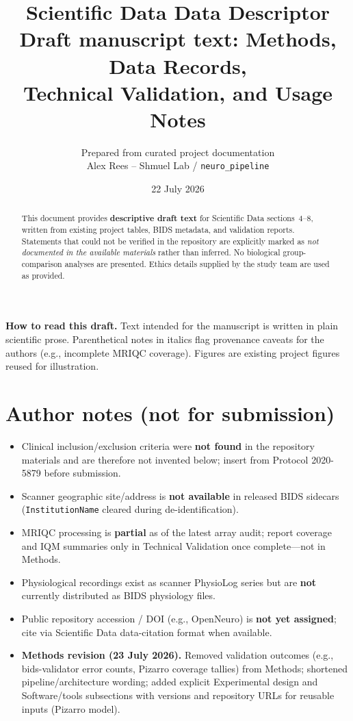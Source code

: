 \documentclass[11pt,letterpaper]{article}
\title{Scientific Data Data Descriptor\\[0.35em]
\large Draft manuscript text: Methods, Data Records,\\
Technical Validation, and Usage Notes}
\author{Prepared from curated project documentation\\
\small Alex Rees -- Shmuel Lab / \texttt{neuro\_pipeline}}
\date{22 July 2026}
\begin{document}
\maketitle

\begin{abstract}
\noindent
This document provides \textbf{descriptive draft text} for Scientific Data
sections~4--8, written from existing project tables, BIDS metadata, and
validation reports. Statements that could not be verified in the repository
are explicitly marked as \textit{not documented in the available materials}
rather than inferred. No biological group-comparison analyses are presented.
Ethics details supplied by the study team are used as provided.
\end{abstract}

\tableofcontents
\newpage

\noindent\textbf{How to read this draft.}
Text intended for the manuscript is written in plain scientific prose.
Parenthetical notes in italics flag provenance caveats for the authors
(e.g., incomplete MRIQC coverage). Figures are existing project figures
reused for illustration.

\section*{Author notes (not for submission)}

\begin{itemize}[leftmargin=*]
  \item Clinical inclusion/exclusion criteria were \textbf{not found} in the
        repository materials and are therefore not invented below; insert from
        Protocol 2020-5879 before submission.
  \item Scanner geographic site/address is \textbf{not available} in released
        BIDS sidecars (\texttt{InstitutionName} cleared during de-identification).
  \item MRIQC processing is \textbf{partial} as of the latest array audit;
        report coverage and IQM summaries only in Technical Validation once
        complete---not in Methods.
  \item Physiological recordings exist as scanner PhysioLog series but are
        \textbf{not} currently distributed as BIDS physiology files.
  \item Public repository accession / DOI (e.g., OpenNeuro) is \textbf{not yet
        assigned}; cite via Scientific Data data-citation format when available.
  \item \textbf{Methods revision (23 July 2026).} Removed validation outcomes
        (e.g., bids-validator error counts, Pizarro coverage tallies) from
        Methods; shortened pipeline/architecture wording; added explicit
        Experimental design and Software/tools subsections with versions and
        repository URLs for reusable inputs (Pizarro model).
\end{itemize}
\end{document}
